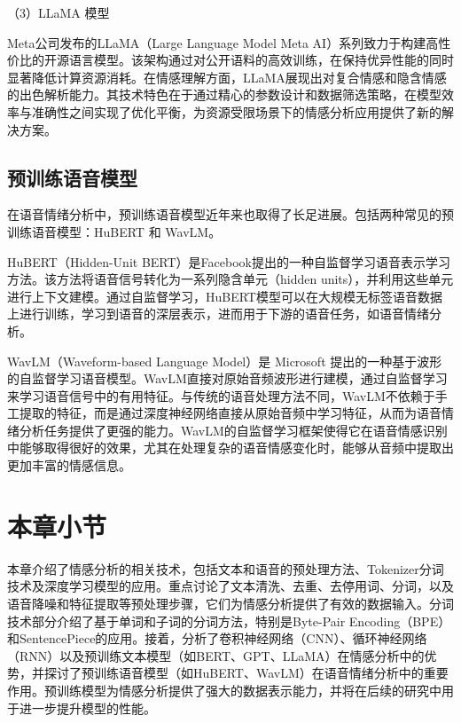 （3）LLaMA 模型

Meta公司发布的LLaMA（Large Language Model Meta AI）\cite{Touvron_Lavril_Izacard_Martinet_Lachaux_Lacroix_Roziere_Goyal_Hambro_Azhar_et}系列致力于构建高性价比的开源语言模型。该架构通过对公开语料的高效训练，在保持优异性能的同时显著降低计算资源消耗。在情感理解方面，LLaMA展现出对复合情感和隐含情感的出色解析能力。其技术特色在于通过精心的参数设计和数据筛选策略，在模型效率与准确性之间实现了优化平衡，为资源受限场景下的情感分析应用提供了新的解决方案。

\subsection{预训练语音模型}

在语音情绪分析中，预训练语音模型近年来也取得了长足进展。包括两种常见的预训练语音模型：HuBERT\cite{Hsu_Bolte_Tsai_Lakhotia_Salakhutdinov_Mohamed_2021} 和 WavLM\cite{Chen_2022}。

HuBERT（Hidden-Unit BERT）是Facebook提出的一种自监督学习语音表示学习方法。该方法将语音信号转化为一系列隐含单元（hidden units），并利用这些单元进行上下文建模。通过自监督学习，HuBERT模型可以在大规模无标签语音数据上进行训练，学习到语音的深层表示，进而用于下游的语音任务，如语音情绪分析。

WavLM（Waveform-based Language Model）是 Microsoft 提出的一种基于波形的自监督学习语音模型。WavLM直接对原始音频波形进行建模，通过自监督学习来学习语音信号中的有用特征。与传统的语音处理方法不同，WavLM不依赖于手工提取的特征，而是通过深度神经网络直接从原始音频中学习特征，从而为语音情绪分析任务提供了更强的能力。WavLM的自监督学习框架使得它在语音情感识别中能够取得很好的效果，尤其在处理复杂的语音情感变化时，能够从音频中提取出更加丰富的情感信息。

\section{本章小节}

本章介绍了情感分析的相关技术，包括文本和语音的预处理方法、Tokenizer分词技术及深度学习模型的应用。重点讨论了文本清洗、去重、去停用词、分词，以及语音降噪和特征提取等预处理步骤，它们为情感分析提供了有效的数据输入。分词技术部分介绍了基于单词和子词的分词方法，特别是Byte-Pair Encoding（BPE）和SentencePiece的应用。接着，分析了卷积神经网络（CNN）、循环神经网络（RNN）以及预训练文本模型（如BERT、GPT、LLaMA）在情感分析中的优势，并探讨了预训练语音模型（如HuBERT、WavLM）在语音情绪分析中的重要作用。预训练模型为情感分析提供了强大的数据表示能力，并将在后续的研究中用于进一步提升模型的性能。
